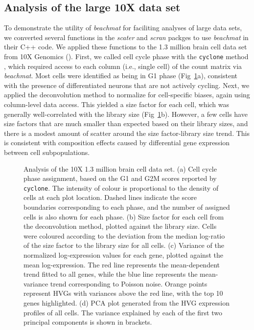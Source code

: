 \documentclass[10pt,letterpaper]{article}
\newcommand{\beachmat}{\textit{beachmat}}
\newcommand{\code}[1]{\texttt{#1}}
\begin{document}
\subsection*{Analysis of the large 10X data set}
To demonstrate the utility of \beachmat{} for faciliting analyses of large data sets, we converted several functions in the \textit{scater} \cite{mccarthy2017scater} and \textit{scran} packges \cite{lun2016stepbystep} to use \beachmat{} in their C++ code.
We applied these functions to the 1.3 million brain cell data set from 10X Genomics (\suppsecrealtenx{}).
First, we called cell cycle phase with the \code{cyclone} method \cite{scialdone2015computational}, which required access to each column (i.e., single cell) of the count matrix via \beachmat{}. 
Most cells were identified as being in G1 phase (Fig~\ref{fig:tenx}a), consistent with the presence of differentiated neurons that are not actively cycling.
Next, we applied the deconvolution method \cite{lun2016pooling} to normalize for cell-specific biases, again using column-level data access.
This yielded a size factor for each cell, which was generally well-correlated with the library size (Fig~\ref{fig:tenx}b).
However, a few cells have size factors that are much smaller than expected based on their library sizes, and there is a modest amount of scatter around the size factor-library size trend.
This is consistent with composition effects \cite{robinson2010scaling} caused by differential gene expression between cell subpopulations.

\begin{figure}[b]
    \caption{Analysis of the 10X 1.3 million brain cell data set.
        (a) Cell cycle phase assignment, based on the G1 and G2M scores reported by \code{cyclone}.
        The intensity of colour is proportional to the density of cells at each plot location.
        Dashed lines indicate the score boundaries corresponding to each phase, and the number of assigned cells is also shown for each phase.
        (b) Size factor for each cell from the deconvolution method, plotted against the library size.
        Cells were coloured according to the deviation from the median log-ratio of the size factor to the library size for all cells.
        (c) Variance of the normalized log-expression values for each gene, plotted against the mean log-expression.
        The red line represents the mean-dependent trend fitted to all genes, while the blue line represents the mean-variance trend corresponding to Poisson noise.
        Orange points represent HVGs with variances above the red line, with the top 10 genes highlighted.
        (d) PCA plot generated from the HVG expression profiles of all cells.
        The variance explained by each of the first two principal components is shown in brackets.
    }
    \label{fig:tenx}
\end{figure}
\end{document}
